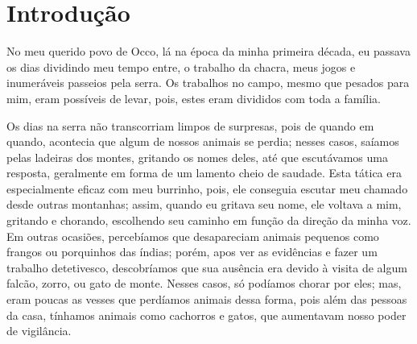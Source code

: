 \cleardoublepage
\newpage
{}
\chapter*{Introdução} %

No meu querido povo de Occo, lá na época da minha primeira década, eu passava os dias dividindo meu tempo entre, o trabalho da chacra, meus jogos e inumeráveis passeios pela serra.
Os trabalhos no campo, mesmo que pesados para mim, eram possíveis de levar, pois, estes eram divididos com toda a família.

Os dias na serra não transcorriam limpos de surpresas, pois de quando em quando, acontecia que algum de nossos animais se perdia; nesses casos, saíamos pelas ladeiras dos montes, gritando os nomes deles, até que escutávamos uma resposta, geralmente em forma de um lamento cheio de saudade.
Esta tática era especialmente eficaz com meu burrinho, pois, ele conseguia escutar meu chamado desde outras montanhas; assim, quando eu gritava seu nome, ele voltava a mim, gritando e chorando, escolhendo seu caminho em função da direção da minha voz.
Em outras ocasiões, percebíamos que desapareciam animais pequenos como frangos ou porquinhos das índias; porém, apos ver as evidências e fazer um trabalho detetivesco, descobríamos que sua ausência era devido à visita de algum falcão, zorro, ou gato de monte.
Nesses casos, só podíamos chorar por eles; mas,  eram poucas as vesses que perdíamos animais dessa forma, pois além das pessoas da casa, tínhamos animais como cachorros e gatos, que aumentavam nosso poder de vigilância.

